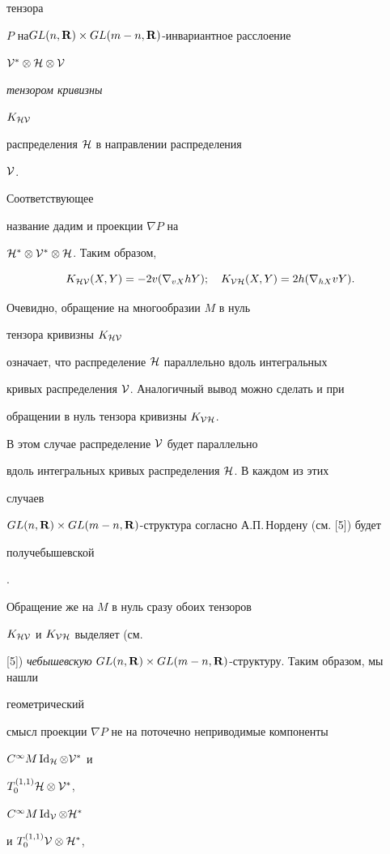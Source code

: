 тензора 


$P$ на\linebreak $GL(n,\bold R)\times GL(m-n,\bold R)$-инвариантное расслоение 


$\cal V^*\otimes\cal H\otimes\cal V$ {\it тензором кривизны 


$K_{\cal H\cal V}$ 


распределения $\cal H$ в направлении распределения} $\cal V$. 


Соответствующее 


название дадим и проекции $\nabla P$ на 


$\cal H^*\otimes\cal V^*\otimes\cal H$. Таким образом, 


$$ 


K_{\cal H\cal V}(X,Y)=-2v(\nabla_{vX}hY);\quad 


K_{\cal V\cal H}(X,Y)=2h(\nabla_{hX}vY). 


$$ 


Очевидно, обращение на многообразии $M$ в нуль


тензора кривизны $K_{\cal H\cal V}$ 


означает, что распределение $\cal H$ параллельно вдоль интегральных 


кривых распределения $\cal V$. Аналогичный вывод можно сделать и при 


обращении в нуль тензора кривизны $K_{\cal V\cal H}$.


В этом случае распределение $\cal V$ будет параллельно 


вдоль интегральных кривых распределения $\cal H$. В каждом из этих 


случаев 


$GL(n,\bold R)\times GL(m-n,\bold R)$-структура согласно А.П.\,Нордену (см. [5]) будет {\it 


получебышевской}. 


Обращение же на $M$ в нуль сразу обоих тензоров 


$K_{\cal H\cal V}$ и $K_{\cal V\cal H}$ выделяет (см. 


[5]) {\it чебышевскую} $GL(n,\bold R)\times GL(m-n,\bold R)$-структуру. Таким образом, мы нашли 


геометрический 


смысл проекции $\nabla P$ не на поточечно неприводимые компоненты 


$C^\infty M\operatorname{Id}_{\cal H}\otimes\cal V^*$ и 


$T^{(1,1)}_0\cal H\otimes\cal V^*$, 


$C^\infty M\operatorname{Id}_{\cal V}\otimes\cal H^*$ 


и $T^{(1,1)}_0\cal V\otimes\cal H^*$, 


